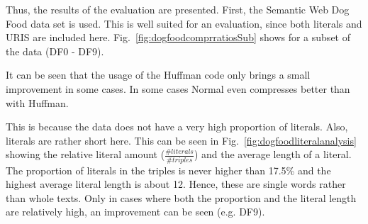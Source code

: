 Thus, the results of the evaluation are presented. First, the Semantic Web Dog Food data set is used. This is well suited for an evaluation, since both literals and URIS are included here. Fig.~\ref{fig:dogfoodcomprratiosSub} shows  for a subset of the data (DF0 - DF9). 

It can be seen that the usage of the Huffman code only brings a small improvement in some cases. In some cases Normal \DHDT{} even compresses better than \DHDT{} with Huffman.

This is because the data does not have a very high proportion of literals. Also, literals are rather short here. This can be seen in Fig.~\ref{fig:dogfoodliteralanalysis} showing the relative literal amount ($\frac{\#literals}{\#triples}$) and the average length of a literal. The proportion of literals in the triples is never higher than 17.5\% and the highest average literal length is about 12. Hence, these are single words rather than whole texts. Only in cases where both the proportion and the literal length are relatively high, an improvement can be seen (e.g. DF9).


